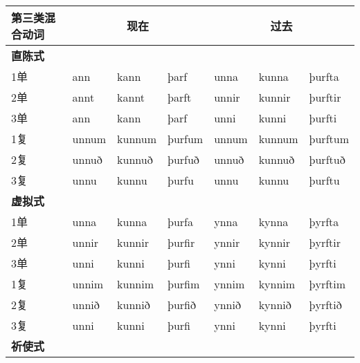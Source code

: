 \begin{longtable}{lllllll}

    \toprule
    第三类混合动词  & \multicolumn{3}{c}{现在} & \multicolumn{3}{c}{过去}                                         \\
    \midrule
    \endhead
    \bottomrule
    \endfoot
    \textbf{直陈式} & ~                        & ~                        & ~        & ~       & ~      & ~       \\
    1单             & ann                      & kann                     & þarf     & unna    & kunna  & þurfta  \\
    2单             & annt                     & kannt                    & þarft    & unnir   & kunnir & þurftir \\
    3单             & ann                      & kann                     & þarf     & unni    & kunni  & þurfti  \\
    1复             & unnum                    & kunnum                   & þurfum   & unnum   & kunnum & þurftum \\
    2复             & unnuð                    & kunnuð                   & þurfuð   & unnuð   & kunnuð & þurftuð \\
    3复             & unnu                     & kunnu                    & þurfu    & unnu    & kunnu  & þurftu  \\
    \textbf{虚拟式} & ~                        & ~                        & ~        & ~       & ~      & ~       \\
    1单             & unna                     & kunna                    & þurfa    & ynna    & kynna  & þyrfta  \\
    2单             & unnir                    & kunnir                   & þurfir   & ynnir   & kynnir & þyrftir \\
    3单             & unni                     & kunni                    & þurfi    & ynni    & kynni  & þyrfti  \\
    1复             & unnim                    & kunnim                   & þurfim   & ynnim   & kynnim & þyrftim \\
    2复             & unnið                    & kunnið                   & þurfið   & ynnið   & kynnið & þyrftið \\
    3复             & unni                     & kunni                    & þurfi    & ynni    & kynni  & þyrfti  \\
    \textbf{祈使式} & ~                        & ~                        & ~        & ~       & ~      & ~       \\

\end{longtable}
